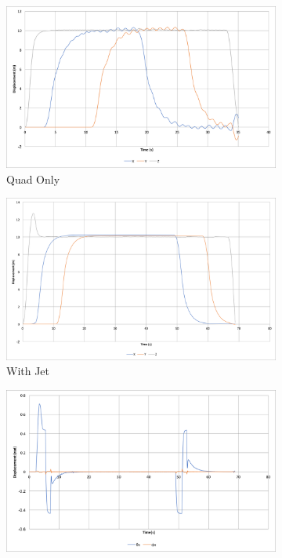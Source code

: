 \documentclass[11pt]{article}
\begin{document}
\begin{figure}[p]
    \begin{subfigure}{0.48\textwidth}
        \includegraphics[width=\linewidth]{square_path_quad_only}
        \caption{Quad Only}
        \label{fig:square_path_quad_only}
    \end{subfigure}\hspace*{\fill}
    \begin{subfigure}{0.48\textwidth}
    \end{subfigure}
    \medskip
    \begin{subfigure}{0.48\textwidth}
        \includegraphics[width=\linewidth]{square_path_w_jet}
        \caption{With Jet}
        \label{fig:square_path_w_jet}
    \end{subfigure}\hspace*{\fill}
    \begin{subfigure}{0.48\textwidth}
        \includegraphics[width=\linewidth]{square_path_w_jet_angle}

\end{subfigure}
\end{figure}
\end{document}
